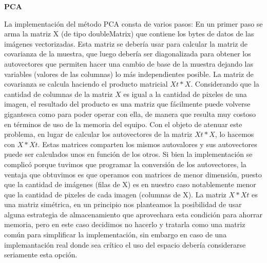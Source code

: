 \textbf{PCA}

La implementación del método PCA consta de varios pasos:
En un primer paso se arma la matriz X (de tipo doubleMatrix) que contiene los bytes de datos de las imágenes vectorizadas. Esta matriz se debería usar para calcular la matriz de covarianza de la muestra, que luego debería ser diagonalizada para obtener los autovectores que permiten hacer una cambio de base de la muestra dejando las variables (valores de las columnas) lo más independientes posible.
La matriz de covarianza se calcula haciendo el producto matricial $X{t} * X$. Considerando que la cantidad de columnas de la matriz $X$ es igual a la cantidad de pixeles de una imagen, el resultado del producto es una matriz que fácilmente puede volverse gigantesca como para poder operar con ella, de manera que resulta muy costoso en términos de uso de la memoria del equipo. Con el objeto de atenuar este problema, en lugar de calcular los autovectores de la matriz $X{t} * X$, lo hacemos con $X * X{t}$. Estas matrices comparten los mismos autovalores y sus autovectores puede ser calculados unos en función de los otros. Si bien la implementación se complicó porque tuvimos que programar la conversión de los autovectores, la ventaja que obtuvimos es que operamos con matrices de menor dimensión, puesto que la cantidad de imágenes (filas de X) es en nuestro caso notablemente menor que la cantidad de pixeles de cada imagen (columnas de X).
La matriz $X * X{t}$ es una matriz simétrica, en un principio nos planteamos la posibilidad de usar alguna estrategia de almacenamiento que aprovechara esta condición para ahorrar memoria, pero en este caso decidimos no hacerlo y tratarla como una matriz común para simplificar la implementación, sin embargo en caso de una implemantación real donde sea crítico el uso del espacio debería considerarse seriamente esta opción.

